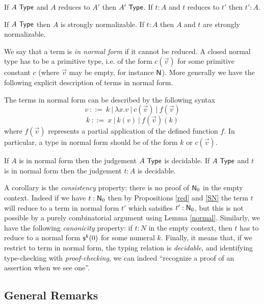 \documentclass[10pt,a4paper]{article}
\newcommand{\Type}{{\sf Type}}
\newcommand{\suc}{{\sf s}}
\newcommand{\NN}{{\sf N}}
\begin{document}
\begin{proposition}\label{red}
If $A~\Type$ and $A$ reduces to $A'$ then $A'~\Type$.
If $t:A$ and $t$ reduces to $t'$ then $t':A$.
\end{proposition}

\begin{proposition}\label{SN}
 If $A~\Type$ then $A$ is strongly normalizable.
If $t:A$ then $A$ and $t$ are strongly normalizable. 
\end{proposition}

 We say that a term is {\em in normal form} if it cannot be reduced.
A closed normal type has to be a primitive type, i.e. of the form $c(\vec{v})$ for some
primitive constant $c$ (where $\vec{v}$ may be empty, for instance $\NN$). 
More generally we have the following explicit description of terms in normal form.

\begin{lemma}\label{normal}
The terms in normal form can be described by the following syntax
$$
v~::=~ k~|~\lambda x.v~|~c(\vec{v})~|~f(\vec{v})
$$
$$
k~::=~x~|~k(v)~|~f(\vec{v})(k)
$$
where $f(\vec{v})$ represents a partial application of the defined function $f$.
In particular, a type in normal form should be of the form $k$ or $c(\vec{v})$.
\end{lemma}

\begin{proposition}
If $A$ is in normal form then the 
judgement $A~\Type$ is decidable. If $A~\Type$ and $t$ is in normal form then the judgement
$t:A$ is decidable.
\end{proposition}


 A corollary is the {\em consistency} property: there is no proof of $\NN_0$ in the empty
context. Indeed if we have $t:\NN_0$ then by Propositions \ref{red} and \ref{SN} the term $t$ will reduce
to a term in normal form $t'$ which satsifies $t':\NN_0$, but this is not possible by a 
purely combinatorial argument using Lemma \ref{normal}. Similarly, we have the following
{\em canonicity} property: if $t:N$ in the empty context, then $t$ has to reduce to a
normal form $\suc^k(0)$ for some numeral $k$. Finally, it means that, if we restrict to term
in normal form, the typing relation is {\em decidable}, and identifying type-checking with
{\em proof-checking}, we can indeed ``recognize a proof of an assertion when we see one''.

\subsection*{General Remarks}
\end{document}
